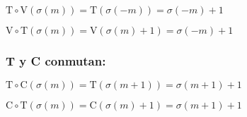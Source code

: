 		$\text{T}\circ\text{V}(\sigma(m))=\text{T}(\sigma(-m))=\sigma(-m)+1$
		
		$\text{V}\circ\text{T}(\sigma(m))=\text{V}(\sigma(m)+1)=\sigma(-m)+1$
		
		\subsubsection*{T y C conmutan:}
		
		$\text{T}\circ\text{C}(\sigma(m))=\text{T}(\sigma(m+1))=\sigma(m+1)+1$
		
		$\text{C}\circ\text{T}(\sigma(m))=\text{C}(\sigma(m)+1)=\sigma(m+1)+1$